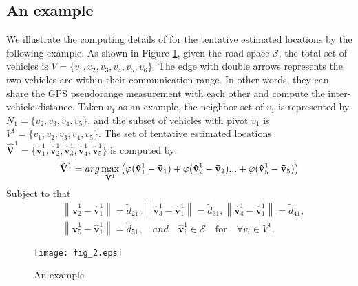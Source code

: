 \documentclass[letterpaper, 10 pt, conference]{ieeeconf}
\begin{document}
\subsection{An example}
We illustrate the computing details of for the tentative estimated locations  by the following example. As shown in Figure \ref{fig:2}, given the road space $\mathscr{S}$, the total set of vehicles is $V = \{ v_1 ,v_2 ,v_3 ,v_4 ,v_5 ,v_6 \}$. The edge with double arrows  represents the two vehicles are within their communication range. In other words, they can share the GPS pseudorange measurement with each other and compute the inter-vehicle distance. Taken   $v_1$ as an example, the neighbor set of $v_1$ is represented by $N_1  = \{ v_2 ,v_3 ,v_4 ,v_5 \}$, and the subset of vehicles with pivot $v_1$  is  $V^1  = \{ v_1 ,v_2 ,v_3 ,v_4 ,v_5 \}$. The set of tentative estimated locations ${\mathbf{\hat V}}^1  = \{ {\mathbf{\hat v}}_1^1 ,{\mathbf{\hat v}}_2^1 ,{\mathbf{\hat v}}_3^1 ,{\mathbf{\hat v}}_4^1 ,{\mathbf{\hat v}}_5^1 \} $ is computed by:
\setlength{\abovedisplayskip}{2mm}
\setlength{\belowdisplayskip}{2mm}
\begin{eqnarray}
{\mathbf{\hat V}}^1  = arg{\rm{ }}\mathop {\max }\limits_{{\mathbf{\hat V}}^1 } \left( {\varphi ({\mathbf{\hat v}}_1^1  - {\mathbf{\tilde v}}_1 ) + \varphi ({\mathbf{\hat v}}_2^1  - {\mathbf{\tilde v}}_2 )... + \varphi ({\mathbf{\hat v}}_5^1  - {\mathbf{\tilde v}}_5 )} \right)
\end{eqnarray}
Subject to that
\begin{align*}
&\left\| {{\mathbf{\hat v}}_2^1  - {\mathbf{\hat v}}_1^1 } \right\| = \tilde d_{21},
\left\| {{\mathbf{\hat v}}_3^1  - {\mathbf{\hat v}}_1^1 } \right\| = \tilde d_{31},
\left\| {{\mathbf{\hat v}}_4^1  - {\mathbf{\hat v}}_1^1 } \right\| = \tilde d_{41}, \\&
\left\| {{\mathbf{\hat v}}_5^1  - {\mathbf{\hat v}}_1^1 }\right\| = \tilde d_{51}, \quad and \quad {\mathbf{\hat v}}_i^1  \in \mathscr{S}  \quad \mbox{for}\quad \forall v_i  \in V^1.
\end{align*}


\begin{figure}
\centering
\texttt{[image: fig\_2.eps]}
\caption{An example}
\label{fig:2}
\end{figure}
\end{document}

